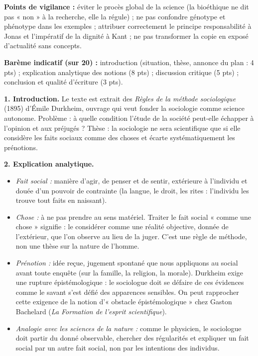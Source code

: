 \documentclass[11pt]{article}
\begin{document}
\begin{corrige}
\textbf{Points de vigilance :} éviter le procès global de la science (la bioéthique ne dit pas « non » à la recherche, elle la régule) ; ne pas confondre génotype et phénotype dans les exemples ; attribuer correctement le principe responsabilité à Jonas et l'impératif de la dignité à Kant ; ne pas transformer la copie en exposé d'actualité sans concepts.
\end{corrige}

\begin{corrige}
\textbf{Barème indicatif (sur 20) :} introduction (situation, thèse, annonce du plan : 4 pts) ; explication analytique des notions (8 pts) ; discussion critique (5 pts) ; conclusion et qualité d'écriture (3 pts).

\textbf{1. Introduction.} Le texte est extrait des \emph{Règles de la méthode sociologique} (1895) d'Émile Durkheim, ouvrage qui veut fonder la sociologie comme science autonome. Problème : à quelle condition l'étude de la société peut-elle échapper à l'opinion et aux préjugés ? Thèse : la sociologie ne sera scientifique que si elle considère les faits sociaux comme des choses et écarte systématiquement les prénotions.

\textbf{2. Explication analytique.}
\begin{itemize}
\item \emph{Fait social :} manière d'agir, de penser et de sentir, extérieure à l'individu et douée d'un pouvoir de contrainte (la langue, le droit, les rites : l'individu les trouve tout faits en naissant).
\item \emph{Chose :} à ne pas prendre au sens matériel. Traiter le fait social « comme une chose » signifie : le considérer comme une réalité objective, donnée de l'extérieur, que l'on observe au lieu de la juger. C'est une règle de méthode, non une thèse sur la nature de l'homme.
\item \emph{Prénotion :} idée reçue, jugement spontané que nous appliquons au social avant toute enquête (sur la famille, la religion, la morale). Durkheim exige une rupture épistémologique : le sociologue doit se défaire de ces évidences comme le savant s'est défié des apparences sensibles. On peut rapprocher cette exigence de la notion d'« obstacle épistémologique » chez Gaston Bachelard (\emph{La Formation de l'esprit scientifique}).
\item \emph{Analogie avec les sciences de la nature :} comme le physicien, le sociologue doit partir du donné observable, chercher des régularités et expliquer un fait social par un autre fait social, non par les intentions des individus.
\end{itemize}


\end{corrige}
\end{document}

